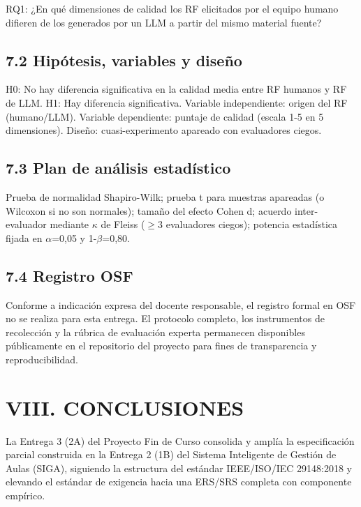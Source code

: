 RQ1: ¿En qué dimensiones de calidad los RF elicitados por el equipo humano difieren de los generados por un LLM a partir del mismo material fuente?


\subsection*{7.2 Hipótesis, variables y diseño}


H0: No hay diferencia significativa en la calidad media entre RF humanos y RF de LLM. H1: Hay diferencia significativa. Variable independiente: origen del RF (humano/LLM). Variable dependiente: puntaje de calidad (escala 1-5 en 5 dimensiones). Diseño: cuasi-experimento apareado con evaluadores ciegos.


\subsection*{7.3 Plan de análisis estadístico}


Prueba de normalidad Shapiro-Wilk; prueba t para muestras apareadas (o Wilcoxon si no son normales); tamaño del efecto Cohen d; acuerdo inter-evaluador mediante $\kappa$ de Fleiss ($\geq$3 evaluadores ciegos); potencia estadística fijada en $\alpha$=0,05 y 1-$\beta$=0,80.


\subsection*{7.4 Registro OSF}


Conforme a indicación expresa del docente responsable, el registro formal en OSF no se realiza para esta entrega. El protocolo completo, los instrumentos de recolección y la rúbrica de evaluación experta permanecen disponibles públicamente en el repositorio del proyecto para fines de transparencia y reproducibilidad.


\section*{VIII. CONCLUSIONES}


La Entrega 3 (2A) del Proyecto Fin de Curso consolida y amplía la especificación parcial construida en la Entrega 2 (1B) del Sistema Inteligente de Gestión de Aulas (SIGA), siguiendo la estructura del estándar IEEE/ISO/IEC 29148:2018 y elevando el estándar de exigencia hacia una ERS/SRS completa con componente empírico.


